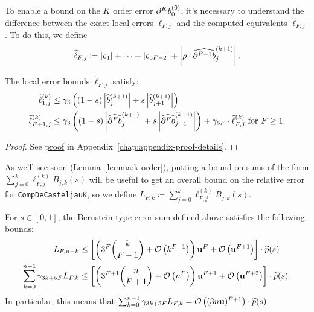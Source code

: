 To enable a bound on the \(K\) order error \(\db{K}^{(0)}_0\), it's necessary
to understand the difference between the exact local errors \(\ell_{F, j}\)
and the computed equivalents \(\widehat{\ell}_{F, j}\). To do this, we define
\begin{equation}
\widetilde{\ell}_{F, j} \coloneqq \left|e_1\right| +
\cdots + \left|e_{5F - 2}\right| + \left|\rho \cdot
\cdb{F - 1}_j^{(k + 1)}\right|.
\end{equation}

\begin{lemma}\label{lemma:ell-tilde}
The local error bounds \(\widetilde{\ell}_{F, j}\) satisfy:
\begin{align}
\widetilde{\ell}_{1, j}^{(k)} &\leq
  \gamma_3 \left(
  (1 - s) \left|\widehat{b}_j^{(k + 1)}\right| +
  s \left|\widehat{b}_{j + 1}^{(k + 1)}\right|\right)
  \label{eq:ell-tilde-1} \\
\widetilde{\ell}_{F + 1, j}^{(k)} &\leq
  \gamma_3 \left(
  (1 - s) \left|\cdb{F}_j^{(k + 1)}\right| +
  s \left|\cdb{F}_{j + 1}^{(k + 1)}\right|\right) +
  \gamma_{5F} \cdot \widetilde{\ell}_{F, j}^{(k)}
  \text{ for } F \geq 1.
\end{align}
\end{lemma}

\begin{proof}
See \hyperref[proof:ell-tilde]{proof} in
Appendix~\ref{chap:appendix-proof-details}.
\end{proof}

As we'll see soon (Lemma~\ref{lemma:k-order}), putting a bound on
sums of the form \(\sum_{j = 0}^k \ell_{F, j}^{(k)} B_{j, k}(s)\) will
be useful to get an overall bound on the relative error for
\texttt{CompDeCasteljauK}, so we define
\(L_{F, k} \coloneqq \sum_{j = 0}^k \ell_{F, j}^{(k)} B_{j, k}(s)\).

\begin{lemma}\label{lemma:L-and-D-bounds}
For \(s \in \left[0, 1\right]\), the Bernstein-type error sum defined above
satisfies the following bounds:
\begin{align}
L_{F, n - k} &\leq \left[\left(3^F \binom{k}{F - 1} + \mathcal{O}\left(k^{F - 1}\right)\right)
  \mathbf{u}^F + \mathcal{O}\left(\mathbf{u}^{F + 1}\right)\right] \cdot \widetilde{p}(s) \\
\sum_{k = 0}^{n - 1} \gamma_{3k + 5F} L_{F, k} &\leq
  \left[\left(3^{F + 1} \binom{n}{F + 1} + \mathcal{O}\left(n^F\right)\right)
  \mathbf{u}^{F + 1} + \mathcal{O}\left(\mathbf{u}^{F + 2}\right)\right] \cdot \widetilde{p}(s).
  \label{eq:L-sum-bound}
\end{align}
In particular, this means that
\(\sum_{k = 0}^{n - 1} \gamma_{3k + 5F} L_{F, k} =
\mathcal{O}\left((3 n \mathbf{u})^{F + 1}\right) \cdot \widetilde{p}(s)\).
\end{lemma}

